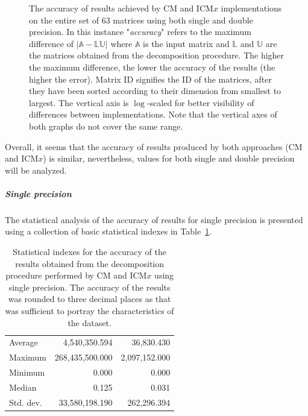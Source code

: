 \begin{figure}[ht!]
\begin{subfigure}{\textwidth}
	\end{subfigure}
	\caption{The accuracy of results achieved by CM and ICM$ x $ implementations on the entire set of 63 matrices using both single and double precision. In this instance "\textit{accuracy}" refers to the maximum difference of $ \left| \mathbb{A} - \mathbb{L}\mathbb{U} \right| $ where $ \mathbb{A} $ is the input matrix and $ \mathbb{L} $ and $ \mathbb{U} $ are the matrices obtained from the decomposition procedure. The higher the maximum difference, the lower the accuracy of the results (the higher the error). Matrix ID signifies the ID of the matrices, after they have been sorted according to their dimension from smallest to largest. The vertical axis is $ \log $-scaled for better visibility of differences between implementations. Note that the vertical axes of both graphs do not cover the same range.}
	\label{Graph:comparing-decomposition-implementations-performance-of-implementations-across-all-matrices-accuracy-single-double-precision}
\end{figure}

Overall, it seems that the accuracy of results produced by both approaches (CM and ICM$ x $) is similar, nevertheless, values for both single and double precision will be analyzed.
\subparagraph{Single precision} The statistical analysis of the accuracy of results for single precision is presented using a collection of basic statistical indexes in Table~\ref{Table:comparing-decomposition-implementations-performance-of-implementations-across-all-matrices-accuracy-statistical-indexes-single-precision}.

\begin{table}[ht!]
	\centering
	\renewcommand{\arraystretch}{1.5}
	\begin{tabular}{|>{\footnotesize}l|>{\raggedleft\arraybackslash\footnotesize}r|>{\raggedleft\arraybackslash\footnotesize}r|}
		\hline
		\multicolumn{1}{|>{\centering\footnotesize}c|}{Accuracy index} & \multicolumn{1}{>{\centering\footnotesize}c|}{CM} & \multicolumn{1}{>{\centering\footnotesize}c|}{ICM$ x $} \\
		\hline
		Average   &   4,540,350.594 &    36,830.430 \\
		Maximum   & 268,435,500.000 & 2,097,152.000 \\
		Minimum   &           0.000 &         0.000 \\
		Median    &           0.125 &         0.031 \\
		Std. dev. &  33,580,198.190 &   262,296.394 \\
		\hline
	\end{tabular}
	\caption{Statistical indexes for the accuracy of the results obtained from the decomposition procedure performed by CM and ICM$ x $ using single precision. The accuracy of the results was rounded to three decimal places as that was sufficient to portray the characteristics of the dataset.}
	\label{Table:comparing-decomposition-implementations-performance-of-implementations-across-all-matrices-accuracy-statistical-indexes-single-precision}
\end{table}


